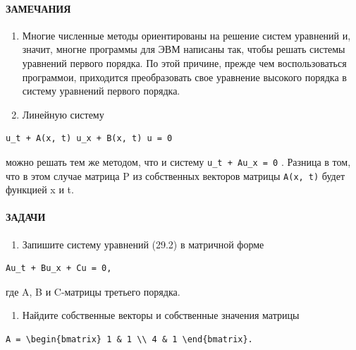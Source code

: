 \documentclass[
  ukrainian,
]{article}
\providecommand{\tightlist}{%
  \setlength{\itemsep}{0pt}\setlength{\parskip}{0pt}}
\begin{document}
\paragraph{ЗАМЕЧАНИЯ}\label{ux437ux430ux43cux435ux447ux430ux43dux438ux44f-5}

\begin{enumerate}
\def\labelenumi{\arabic{enumi}.}
\item
  Многие численные методы ориентированы на решение систем уравнений и,
  значит, многне программы для ЭВМ написаны так, чтобы решать системы
  уравнений первого порядка. По этой причине, прежде чем воспользоваться
  программои, приходится преобразовать свое уравнение высокого порядка в
  систему уравнений первого порядка.
\item
  Линейную систему
\end{enumerate}

\begin{verbatim}
u_t + A(x, t) u_x + B(x, t) u = 0
\end{verbatim}

можно решать тем же методом, что и систему \texttt{u\_t\ +\ Au\_x\ =\ 0}
. Разница в том, что в этом случае матрица P из собственных векторов
матрицы \texttt{A(x,\ t)} будет функцией x и t.

\paragraph{ЗАДАЧИ}\label{ux437ux430ux434ux430ux447ux438-5}

\begin{enumerate}
\def\labelenumi{\arabic{enumi}.}
\tightlist
\item
  Запишите систему уравнений (29.2) в матричной форме
\end{enumerate}

\begin{verbatim}
Au_t + Bu_x + Cu = 0,
\end{verbatim}

где A, B и C-матрицы третьего порядка.

\begin{enumerate}
\def\labelenumi{\arabic{enumi}.}
\setcounter{enumi}{1}
\tightlist
\item
  Найдите собственные векторы и собственные значения матрицы
\end{enumerate}

\begin{verbatim}
A = \begin{bmatrix} 1 & 1 \\ 4 & 1 \end{bmatrix}.
\end{verbatim}
\end{document}
